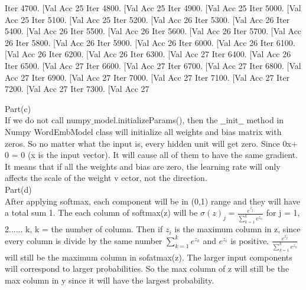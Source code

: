 \documentclass[12pt]{article}
\begin{document}
\begin{python}
Iter 4700. [Val Acc 25%
Iter 4800. [Val Acc 25%
Iter 4900. [Val Acc 25%
Iter 5000. [Val Acc 25%
Iter 5100. [Val Acc 25%
Iter 5200. [Val Acc 26%
Iter 5300. [Val Acc 26%
Iter 5400. [Val Acc 26%
Iter 5500. [Val Acc 26%
Iter 5600. [Val Acc 26%
Iter 5700. [Val Acc 26%
Iter 5800. [Val Acc 26%
Iter 5900. [Val Acc 26%
Iter 6000. [Val Acc 26%
Iter 6100. [Val Acc 26%
Iter 6200. [Val Acc 26%
Iter 6300. [Val Acc 27%
Iter 6400. [Val Acc 26%
Iter 6500. [Val Acc 27%
Iter 6600. [Val Acc 27%
Iter 6700. [Val Acc 27%
Iter 6800. [Val Acc 27%
Iter 6900. [Val Acc 27%
Iter 7000. [Val Acc 27%
Iter 7100. [Val Acc 27%
Iter 7200. [Val Acc 27%
Iter 7300. [Val Acc 27%
\end{python}

Part(c)\\
If we do not call numpy$\_$model.initializeParams(), then the $\_\_$init$\_\_$ method in Numpy
WordEmbModel class will initialize all weights and bias matrix with zeros. So no matter what
the input is, every hidden unit will get zero. Since 0x+
0 = 0 (x is the input vector). It will cause all of them to have the same gradient. It means that
if all the weights and bias are zero, the learning rate will only affects the scale of the weight v
ector, not the direction.\\

Part(d)\\
After applying softmax, each component will be in (0,1) range and they will have a total sum 1. The each column of softmax(z) will be $\sigma(z)_j = \frac{e^{z_j}}{\sum_{k=1}^{k}e^{z_n}}$ for j = 1, 2...... k, k = the number of column. Then  if $z_i$ is the maximum column in z, since every column is divide by the same number $\sum_{k=1}^ke^{z_k}$ and $e^{z_i}$ is positive. $\frac{e^{z_j}}{\sum_{k=1}^{k}e^{z_n}}$ will still be the maximum column in sofatmax(z). The larger input components will correspond to larger probabilities. So the max column of z will
still be the max column in y since it will have the largest probability.\\ 
\end{document}
